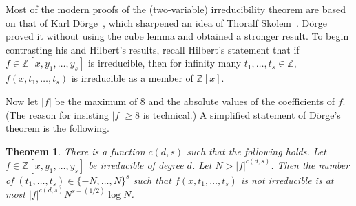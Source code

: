 \documentclass{article}
\theoremstyle{plain}
\newtheorem{thm}{Theorem}
\theoremstyle{definition}
\newcommand{\Zed}{\mathbb{Z}}   %
\begin{document}


Most of the modern proofs of the (two-variable) irreducibility
theorem are based on that of Karl D\"orge~\cite{Dorge}, which sharpened an
idea of Thoralf Skolem~\cite{skolem}. 
D\"orge proved it without using the
cube lemma and obtained a stronger result.  To begin contrasting his and Hilbert's results, recall Hilbert's
statement that if $f\in\Zed[x,y_1,\ldots,y_s]$ is irreducible,
then for infinity many
$t_1,\ldots,t_s \in \Zed$, $f(x,t_1,\ldots,t_s)$ is irreducible as a member of $\Zed[x]$.

Now let $|f|$ be the maximum of $8$ and the absolute values of the coefficients of $f$.
(The reason for insisting $|f| \ge 8$ is technical.)
A simplified statement of D\"orge's theorem is the following.


\begin{thm}\label{thm:Dorge}
There is a function $c(d,s)$ such that the following holds.
Let $f\in\Zed[x,y_1,\ldots,y_s]$ be irreducible of degree $d$.
Let $N>|f|^{c(d,s)}$.
Then the number of $(t_1,\ldots,t_s)\in \{-N,\ldots,N\}^s$ such that 
$f(x,t_1,\ldots,t_s)$ is not irreducible is at most $|f|^{c(d,s)}N^{s-(1/2)}\log N$.
\end{thm}


\end{document}
